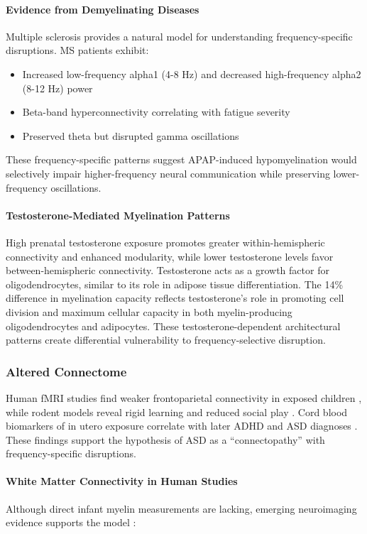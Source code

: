 \documentclass[11pt]{article}
\let\oldsubsubsection\subsubsection
\renewcommand{\subsubsection}[1]{\oldsubsubsection{#1}\setlength{\leftskip}{1.5em}}
\begin{document}
\paragraph{Evidence from Demyelinating Diseases}
Multiple sclerosis provides a natural model for understanding frequency-specific disruptions. MS patients exhibit:
\begin{itemize}
\item Increased low-frequency alpha1 (4-8 Hz) and decreased high-frequency alpha2 (8-12 Hz) power
\item Beta-band hyperconnectivity correlating with fatigue severity  
\item Preserved theta but disrupted gamma oscillations
\end{itemize}

These frequency-specific patterns suggest APAP-induced hypomyelination would selectively impair higher-frequency neural communication while preserving lower-frequency oscillations.

\paragraph{Testosterone-Mediated Myelination Patterns}
High prenatal testosterone exposure promotes greater within-hemispheric connectivity and enhanced modularity, while lower testosterone levels favor between-hemispheric connectivity. Testosterone acts as a growth factor for oligodendrocytes, similar to its role in adipose tissue differentiation. The 14\% difference in myelination capacity reflects testosterone's role in promoting cell division and maximum cellular capacity in both myelin-producing oligodendrocytes and adipocytes. These testosterone-dependent architectural patterns create differential vulnerability to frequency-selective disruption.

\subsubsection{Altered Connectome}
Human fMRI studies find weaker frontoparietal connectivity in exposed children \citep{baker2020}, while rodent models reveal rigid learning and reduced social play \citep{blecharz2018,viberg2014}. Cord blood biomarkers of in utero exposure correlate with later ADHD and ASD diagnoses \citep{ji2020}. These findings support the hypothesis of ASD as a ``connectopathy'' with frequency-specific disruptions.

\paragraph{White Matter Connectivity in Human Studies}
Although direct infant myelin measurements are lacking, emerging neuroimaging evidence supports the model \citep{baker2020}:
\end{document}
